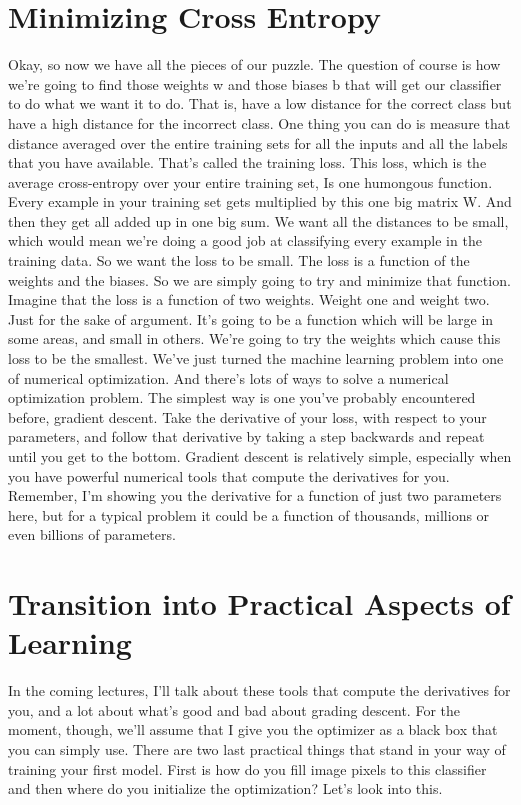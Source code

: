 \documentclass{article}
\begin{document}
\section{Minimizing Cross Entropy}
Okay, so now we have all
the pieces of our puzzle.
The question of course is how we're
going to find those weights w and
those biases b that will get our
classifier to do what we want it to do.
That is, have a low distance for
the correct class but
have a high distance for
the incorrect class.
One thing you can do is measure that
distance averaged over the entire
training sets for all the inputs and
all the labels that you have available.
That's called the training loss.
This loss, which is the average
cross-entropy over your entire training
set, Is one humongous function.
Every example in your training set gets
multiplied by this one big matrix W.
And then they get all
added up in one big sum.
We want all the distances to be small,
which would mean we're
doing a good job at classifying
every example in the training data.
So we want the loss to be small.
The loss is a function of
the weights and the biases.
So we are simply going to try and
minimize that function.
Imagine that the loss is
a function of two weights.
Weight one and weight two.
Just for the sake of argument.
It's going to be a function which
will be large in some areas, and
small in others.
We're going to try the weights which
cause this loss to be the smallest.
We've just turned
the machine learning problem
into one of numerical optimization.
And there's lots of ways to solve
a numerical optimization problem.
The simplest way is one you've probably
encountered before, gradient descent.
Take the derivative of your loss,
with respect to your parameters, and
follow that derivative by
taking a step backwards and
repeat until you get to the bottom.
Gradient descent is relatively simple,
especially when you
have powerful numerical tools that
compute the derivatives for you.
Remember, I'm showing
you the derivative for
a function of just two parameters here,
but for a typical problem
it could be a function of thousands,
millions or even billions of parameters.
\section{Transition into Practical Aspects of Learning}
In the coming lectures, I'll talk about
these tools that compute the derivatives
for you, and a lot about what's good and
bad about grading descent.
For the moment, though, we'll assume
that I give you the optimizer as a black
box that you can simply use.
There are two last practical things
that stand in your way of training
your first model.
First is how do you fill image
pixels to this classifier and
then where do you initialize
the optimization?
Let's look into this.
\end{document}
